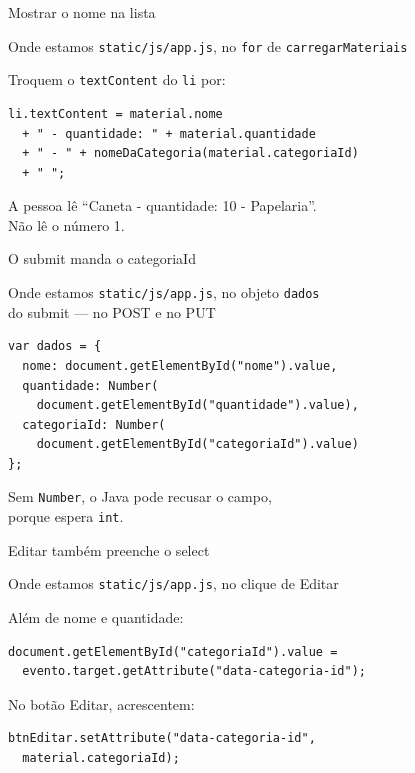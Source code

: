 \documentclass[aspectratio=169,11pt]{beamer}
\newcommand{\onde}[1]{%
  \begin{block}{Onde estamos}
    #1
  \end{block}
}
\begin{document}
\begin{frame}[fragile]{Mostrar o nome na lista}
  \onde{\texttt{static/js/app.js}, no \texttt{for} de
        \texttt{carregarMateriais}}

  Troquem o \texttt{textContent} do \texttt{li} por:

\begin{lstlisting}[basicstyle=\ttfamily\footnotesize]
li.textContent = material.nome
  + " - quantidade: " + material.quantidade
  + " - " + nomeDaCategoria(material.categoriaId)
  + " ";
\end{lstlisting}

  A pessoa lê ``Caneta - quantidade: 10 - Papelaria''.\\
  Não lê o número 1.
\end{frame}

\begin{frame}[fragile]{O submit manda o categoriaId}
  \onde{\texttt{static/js/app.js}, no objeto \texttt{dados}\\
        do submit --- no POST e no PUT}

\begin{lstlisting}[basicstyle=\ttfamily\footnotesize]
var dados = {
  nome: document.getElementById("nome").value,
  quantidade: Number(
    document.getElementById("quantidade").value),
  categoriaId: Number(
    document.getElementById("categoriaId").value)
};
\end{lstlisting}

  Sem \texttt{Number}, o Java pode recusar o campo,\\
  porque espera \texttt{int}.
\end{frame}

\begin{frame}[fragile]{Editar também preenche o select}
  \onde{\texttt{static/js/app.js}, no clique de Editar}

  Além de nome e quantidade:

\begin{lstlisting}[basicstyle=\ttfamily\footnotesize]
document.getElementById("categoriaId").value =
  evento.target.getAttribute("data-categoria-id");
\end{lstlisting}

  \vspace{0.4em}
  No botão Editar, acrescentem:

\begin{lstlisting}[basicstyle=\ttfamily\footnotesize]
btnEditar.setAttribute("data-categoria-id",
  material.categoriaId);
\end{lstlisting}
\end{frame}
\end{document}
